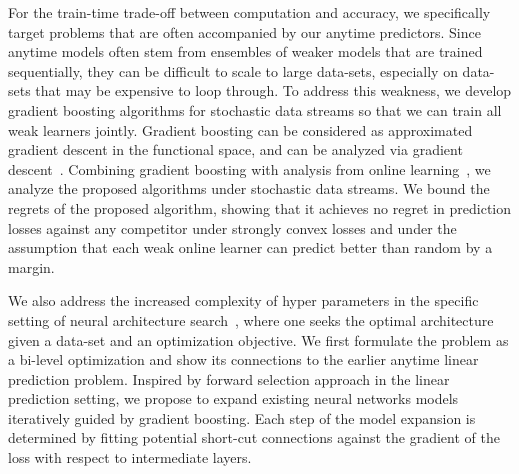 For the train-time trade-off between computation and accuracy, we specifically target problems that are often accompanied by our anytime predictors. Since anytime models often stem from ensembles of weaker models that are trained sequentially, they can be difficult to scale to large data-sets, especially on data-sets that may be expensive to loop through. To address this weakness, we develop gradient boosting algorithms for stochastic data streams so that we can train all weak learners jointly. Gradient boosting can be considered as approximated gradient descent in the functional space, and can be analyzed via gradient descent~\citep{hazan2007logarithmic,grubb2011generalized}. Combining gradient boosting with analysis from online learning~\citep{beygelzimer2015optimal,cesa2004generalization}, we analyze the proposed algorithms under stochastic data streams. We bound the regrets of the proposed algorithm, showing that it achieves no regret in prediction losses against any competitor under strongly convex losses and under the assumption that each weak online learner can predict better than random by a margin.

We also address the increased complexity of hyper parameters in the specific setting of neural architecture search~\citep{nas,Elsken2018NeuralAS}, where one seeks the optimal architecture given a data-set and an optimization objective. We first formulate the problem as a bi-level optimization and show its connections to the earlier anytime linear prediction problem. 
Inspired by forward selection approach in the linear prediction setting, we propose to expand existing neural networks models iteratively guided by gradient boosting. 
Each step of the model expansion is determined by fitting potential short-cut connections against the gradient of the loss with respect to intermediate layers. 

